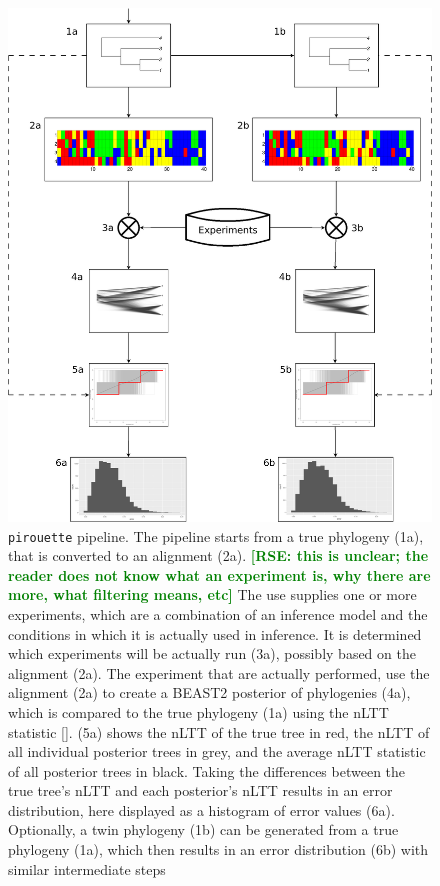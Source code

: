 \documentclass{article}
\newcommand{\rampal}[1]{\textcolor{green}{\textbf{[RSE: #1]}}}
\begin{document}
\begin{figure}
  \centering
  \includegraphics[width=\textwidth]{workflow.png}
  \caption{
    \texttt{pirouette} pipeline. 
    The pipeline starts from a true phylogeny (1a), 
    that is converted to an alignment (2a).
    \rampal{this is unclear; the reader does not know what an experiment is, why there are more, what filtering means, etc}
    The use supplies one or more experiments, which are a combination of 
    an inference model and the conditions in which it is actually used in
    inference.
    It is determined which experiments will be actually run (3a), 
    possibly based on the
    alignment (2a).
    The experiment that are actually performed, use the 
    alignment (2a) to create a BEAST2 posterior of phylogenies (4a),
    which is compared to the true phylogeny (1a) 
    using the nLTT statistic [\cite{janzen2015approximate}]. (5a) shows the nLTT of the true tree in red,
    the nLTT of all individual posterior trees in grey, and the average
    nLTT statistic of all posterior trees in black.
    Taking the differences between the true tree's nLTT and each posterior's
    nLTT results in an error distribution, here displayed as a histogram
    of error values (6a).
    Optionally, a twin phylogeny (1b) can be generated from a true
    phylogeny (1a), which then results in an error distribution (6b) with
    similar intermediate steps 
  }
  \label{fig:pipeline}
\end{figure}
\end{document}
